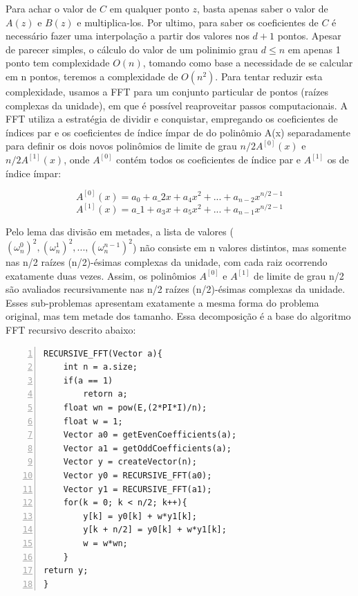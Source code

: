 \documentclass[
	12pt,				%
	oneside,			%
	a4paper,			%
	english,			%
	french,				%
	spanish,			%
	brazil,				%
	]{abntex2}
\begin{document}
Para achar o valor de $C$ em qualquer ponto $z$, basta apenas saber o valor de $A(z)$ e $B(z)$ e multiplica-los. Por ultimo, para saber os coeficientes de $C$ é necessário fazer uma interpolação a partir dos valores nos $d+1$ pontos. Apesar de parecer simples, o cálculo do valor de um polinimio grau $d\le{n}$ em apenas 1 ponto tem complexidade $O(n)$, tomando como base a necessidade de se calcular em n pontos, teremos a complexidade de $O(n^2)$. Para tentar reduzir esta complexidade, usamos a FFT para um conjunto particular de pontos (raízes complexas da unidade), em que é possível reaproveitar passos computacionais.  A FFT utiliza a estratégia de dividir e conquistar, empregando os coeficientes de índices par e os coeficientes de índice ímpar de do polinômio A(x) separadamente para definir os dois novos polinômios de limite de grau \(n/2 A^{[0]}(x) \) e \(n/2 A^{[1]}(x) \), onde \(A^{[0]}\) contém todos os coeficientes de índice par e \(A^{[1]}\) os de índice ímpar:


\[A^{[0]}(x) = a_0 + a\_2x + a_4x^2 + ... + a_{n-2}x^{n/2-1} \]
\[A^{[1]}(x) = a\_1 + a_3x + a_5x^2 + ... + a_{n-1}x^{n/2-1} \]


Pelo lema das divisão em metades, a lista de valores (\( (\omega_n^0)^2, (\omega_n^1)^2, ..., (\omega_n^{n-1})^2 \)) não consiste em n valores distintos, mas somente nas n/2 raízes (n/2)-ésimas complexas da unidade, com cada raiz ocorrendo exatamente duas vezes. Assim, os polinômios \(A^{[0]}\) e \(A^{[1]}\) de limite de grau n/2 são avaliados recursivamente nas n/2 raízes (n/2)-ésimas complexas da unidade. Esses sub-problemas apresentam exatamente a mesma forma do problema original, mas tem metade dos tamanho. Essa decomposição é a base do algoritmo FFT recursivo descrito abaixo:
 
\begin{lstlisting}[numbers=left, mathescape=true, label=dijkstra.pseudo.vetor]
RECURSIVE_FFT(Vector a){
    int n = a.size;
    if(a == 1)
        retorn a;
    float wn = pow(E,(2*PI*I)/n);
    float w = 1; 
    Vector a0 = getEvenCoefficients(a);
    Vector a1 = getOddCoefficients(a);
    Vector y = createVector(n);
    Vector y0 = RECURSIVE_FFT(a0);
    Vector y1 = RECURSIVE_FFT(a1);
    for(k = 0; k < n/2; k++){
        y[k] = y0[k] + w*y1[k];
        y[k + n/2] = y0[k] + w*y1[k];
        w = w*wn;
    }   
return y;
}
\end{lstlisting}
\end{document}
